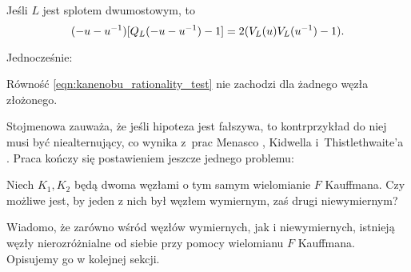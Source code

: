 \begin{proposition}
    Jeśli $L$ jest splotem dwumostowym, to
    \begin{equation}
\label{eqn:kanenobu_rationality_test}%
        (-u-u^{-1}) [Q_L(-u-u^{-1})-1] = 2 (\jones_L(u) \jones_L (u^{-1}) - 1).
    \end{equation}
\end{proposition}

Jednocześnie:

\begin{conjecture}
%
    Równość \ref{eqn:kanenobu_rationality_test} nie zachodzi dla żadnego węzła złożonego.
\end{conjecture}

Stojmenowa \cite[s. 474]{stoimenow00} zauważa, że jeśli hipoteza jest fałszywa, to kontrprzykład do niej musi być niealternujący, co wynika z~prac Menasco \cite{menasco84}, Kidwella \cite{kidwell87} i~Thistlethwaite'a \cite{thistlethwaite87}.
%
%
%
%
Praca \cite[s. 477]{stoimenow00} kończy się postawieniem jeszcze jednego problemu:

\begin{conjecture}
    Niech $K_1, K_2$ będą dwoma węzłami o tym samym wielomianie $F$ Kauffmana.
    Czy możliwe jest, by jeden z nich był węzłem wymiernym, zaś drugi niewymiernym?
\end{conjecture}

Wiadomo, że zarówno wśród węzłów wymiernych, jak i niewymiernych, istnieją węzły nierozróżnialne od siebie przy pomocy wielomianu $F$ Kauffmana.
Opisujemy go w kolejnej sekcji.

%



